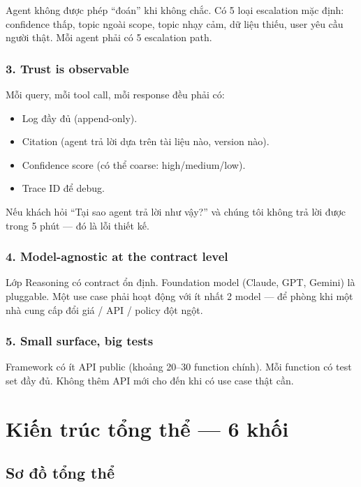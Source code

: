 \documentclass[11pt,a4paper]{article}
\begin{document}
Agent không được phép ``đoán'' khi không chắc. Có 5 loại escalation mặc định:
confidence thấp, topic ngoài scope, topic nhạy cảm, dữ liệu thiếu, user yêu cầu
người thật. Mỗi agent phải có 5 escalation path.

\subsubsection*{3. Trust is observable}

Mỗi query, mỗi tool call, mỗi response đều phải có:
\begin{itemize}
\item Log đầy đủ (append-only).
\item Citation (agent trả lời dựa trên tài liệu nào, version nào).
\item Confidence score (có thể coarse: high/medium/low).
\item Trace ID để debug.
\end{itemize}

Nếu khách hỏi ``Tại sao agent trả lời như vậy?'' và chúng tôi không trả lời được
trong 5 phút --- đó là lỗi thiết kế.

\subsubsection*{4. Model-agnostic at the contract level}

Lớp Reasoning có contract ổn định. Foundation model (Claude, GPT, Gemini) là
pluggable. Một use case phải hoạt động với ít nhất 2 model --- để phòng khi
một nhà cung cấp đổi giá / API / policy đột ngột.

\subsubsection*{5. Small surface, big tests}

Framework có ít API public (khoảng 20--30 function chính). Mỗi function có test
set đầy đủ. Không thêm API mới cho đến khi có use case thật cần.

\clearpage

\section{Kiến trúc tổng thể — 6 khối}

\subsection{Sơ đồ tổng thể}
\end{document}

